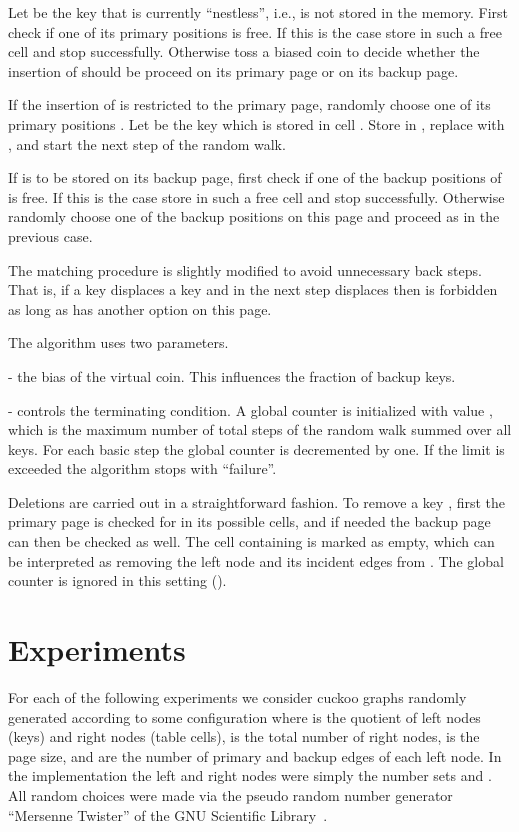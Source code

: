 \let\accentvec\vec \documentclass{llncs}
\newcommand{\ie}{i.e.}
\begin{document}
Let  be the key that is currently ``nestless'', \ie,  is not stored in the memory.
First check if one of its primary positions is free. If this is the case store  in such a free cell and stop successfully. Otherwise toss a biased coin to decide whether the insertion of  should be proceed on its primary page or on its backup page.
\begin{compactitem}\item If the insertion of  is restricted to the primary page, randomly choose one of its primary positions .
Let  be the key which is stored in cell . Store  in , replace  with , and start the next step of the random walk.
\item  If  is to be stored on its backup page, first check if 
one of the backup positions of  is free. If this is the case store  in such a free cell and stop successfully. Otherwise randomly choose one of the backup positions  on this page and proceed as in the previous case.
\end{compactitem}

The matching procedure is slightly modified to avoid unnecessary back steps. That is, if a key  displaces a key  and in the next step  displaces  then  is forbidden as long as  has another option on this page.

The algorithm uses two parameters. 
 \begin{compactitem}
 \item [] - the bias of the virtual coin. This influences the fraction of backup keys. 
 \item []  - controls the terminating condition. A global counter is initialized with value , which is the maximum number of total steps of the random walk summed over all keys. For each basic step the global counter is decremented by one. If the limit is exceeded the algorithm stops with ``failure''.
 \end{compactitem}

Deletions are carried out in a straightforward fashion. To remove a
key , first the primary page is checked for  in its possible
cells, and if needed the backup page can then be checked as well.  The
cell containing  is marked as empty, which can be interpreted as
removing the left node  and its  incident edges from . The
global counter is ignored in this setting ().

\section{Experiments}
For each of the following experiments we consider cuckoo graphs  randomly generated according to some configuration 
 where  is the quotient of left nodes (keys) and right nodes (table cells),  is the total number of right nodes,  is the page size, and  are the number of primary and backup edges of each left node.
In the implementation the left and right nodes were simply the number sets  and . All random choices were made via
the pseudo random number generator {} ``Mersenne Twister'' of the GNU Scientific Library~\cite{GNU_Scientific}.
\end{document}
